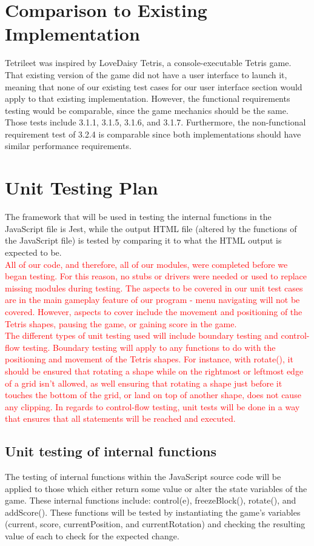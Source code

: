 \documentclass[12pt, titlepage]{article}
\begin{document}
\section{Comparison to Existing Implementation}	

Tetrileet was inspired by LoveDaisy Tetris, a console-executable Tetris game. That existing version of the game did not have a user interface to launch it, meaning that none of our existing test cases for our user interface section would apply to that existing implementation. However, the functional requirements testing would be comparable, since the game mechanics should be the same. Those tests include 3.1.1, 3.1.5, 3.1.6, and 3.1.7. Furthermore, the non-functional requirement test of 3.2.4 is comparable since both implementations should have similar performance requirements.   
				
\section{Unit Testing Plan}
		The framework that will be used in testing the internal functions in the JavaScript file is Jest, while the output HTML file (altered by the functions of the JavaScript file) is tested by comparing it to what the HTML output is expected to be.\\
\textcolor{red}{All of our code, and therefore, all of our modules, were completed before we began testing. For this reason, no stubs or drivers were needed or used to replace missing modules during testing. The aspects to be covered in our unit test cases are in the main gameplay feature of our program - menu navigating will not be covered. However, aspects to cover include the movement and positioning of the Tetris shapes, pausing the game, or gaining score in the game.\\
The different types of unit testing used will include boundary testing and control-flow testing. Boundary testing will apply to any functions to do with the positioning and movement of the Tetris shapes. For instance, with rotate(), it should be ensured that rotating a shape while on the rightmost or leftmost edge of a grid isn't allowed, as well ensuring that rotating a
shape just before it touches the bottom of the grid, or land on top of another shape, does not cause any clipping. In regards to control-flow testing, unit tests will be done in a way that ensures that all statements will be reached and executed.}

\subsection{Unit testing of internal functions}
		The testing of internal functions within the JavaScript source code will be applied to those which either return some value or alter the state variables of the game. These internal functions include: control(e), freezeBlock(), rotate(), and addScore(). These functions will be tested by instantiating the game's variables (current, score, currentPosition, and currentRotation) and checking the resulting value of each to check for the expected change.
\end{document}
